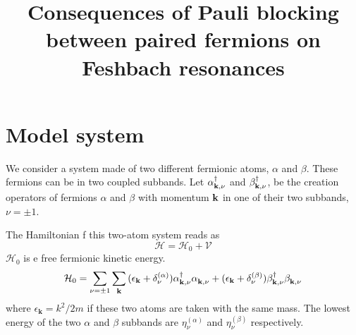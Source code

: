 \documentclass[11pt]{article} %
\title{Consequences of Pauli blocking between paired fermions on Feshbach resonances}
\begin{document}
\maketitle

\section{Model system}

We consider a system made of two different fermionic atoms, $\alpha$ and $\beta$.  These fermions can be in two coupled subbands. Let $\alpha^{\dagger}_{\mathbf{k}, \nu}$ and $\beta^{\dagger}_{\mathbf{k},\nu}$, be the creation operators of fermions $\alpha$ and $\beta$ with momentum $\mathbf{k}$ in one of their two subbands, $\nu=\pm1$. 

The Hamiltonian f this two-atom system reads as 
\begin{equation}
\mathcal{H}=\mathcal{H}_0+\mathcal{V}
\end{equation}
$\mathcal{H}_0$ is e free fermionic kinetic energy. 	
\begin{equation}
\mathcal{H}_0=\sum_{\nu=\pm1}\sum_{\mathbf{k}}{(\epsilon_{\mathbf{k}}+\delta^{(\alpha)}_{\nu})\alpha^{\dagger}_{\mathbf{k}, \nu}\alpha^{}_{\mathbf{k}, \nu}
+(\epsilon_{\mathbf{k}}+\delta^{(\beta)}_{\nu})\beta^{\dagger}_{\mathbf{k}, \nu}\beta^{}_{\mathbf{k}, \nu}}				
\end{equation}	
where $\epsilon_{\mathbf{k}}=k^2/2m$ if these two atoms are taken with the same mass.  The lowest energy of the two $\alpha$ and $\beta$ subbands are $\eta_{\nu}^{(\alpha)}$ and 	 $\eta_{\nu}^{(\beta)}$ respectively. 
\end{document}

